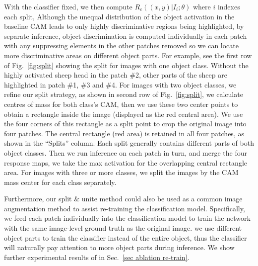 \documentclass[10pt,twocolumn,letterpaper]{article}
\begin{document}
With the classifier fixed, we then compute $R_c((x,y)|I_i;\theta)$ where $i$ indexes each split,
Although the unequal distribution of the object activation in the baseline CAM leads to only highly discriminative regions being highlighted,
by separate inference, object discrimination is computed individually in each patch with any suppressing elements in the other patches removed so we can locate more discriminative areas on different object parts.
For example, see the first row of Fig.~\ref{fig:split} showing the split for images with one object class.
Without the highly activated sheep head in the patch \#2, other parts of the sheep are highlighted in patch \#1, \#3 and \#4.
For images with two object classes, we refine our split strategy,
as shown in second row of Fig.~\ref{fig:split}, we calculate centres of
mass for both class's CAM, then we use these two center points to obtain a rectangle inside the image (displayed as the red central area). 
We use the four corners of this rectangle as a split point to crop the original image into four patches. 
The central rectangle (red area) is retained in all four patches, as shown in the \enquote{Splits} column. Each split generally contains different parts of both object classes.
Then we run inference on each patch in turn, and merge the four response maps, we take the max activation for the overlapping central rectangle area. 
For images with three or more classes, we split the images by the CAM mass center for each class separately.








Furthermore, our split $\&$ unite method could also be used as a common image augmentation method to assist re-training the classification model.
Specifically, we feed each patch individually into the classification model to train the network with the same image-level ground truth as the original image.
\ie we use different object parts to train the classifier instead of the entire object, thus the classifier will naturally pay attention to more object parts during inference.
We show further experimental results of in Sec.~\ref{sec ablation re-train}.
\end{document}
